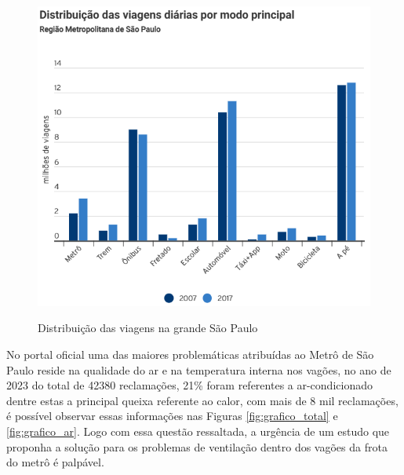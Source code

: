 \documentclass[acronym,symbols,table]{fei}
\begin{document}
\begin{figure}[!htb] 
 \centering
    \caption{Distribuição das viagens na grande São Paulo}
    \includegraphics[width=0.8\linewidth]{Imagens/Distruibuicao.png}
    \label{fig:cnt}
\end{figure}

\newpage 

No portal oficial \textcite{MetroSP} uma das maiores problemáticas atribuídas ao Metrô de São Paulo reside na qualidade do ar e na temperatura interna nos vagões, no ano de 2023 do total de 42380 reclamações, 21\% foram referentes a ar-condicionado dentre estas a principal queixa referente ao calor, com mais de 8 mil reclamações, é possível observar essas informações nas Figuras \ref{fig:grafico_total} e \ref{fig:grafico_ar}. Logo com essa questão ressaltada, a urgência de um estudo que proponha a solução para os problemas de ventilação dentro dos vagões da frota do metrô é palpável.
\end{document}
